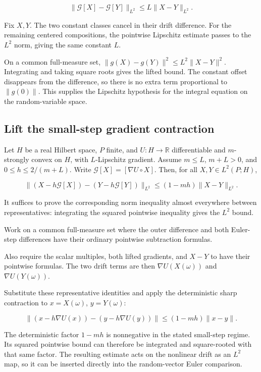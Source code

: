 \documentclass[11pt,a4paper]{article}
\begin{document}
\[\|\mathcal G[X]-\mathcal G[Y]\|_{L^2}\le L\|X-Y\|_{L^2}.\]

Fix \(X,Y\). The two constant classes cancel in their drift difference. For the remaining centered compositions, the pointwise Lipschitz estimate passes to the \(L^2\) norm, giving the same constant \(L\).



On a common full-measure set, \(\|g(X)-g(Y)\|^2\le L^2\|X-Y\|^2\). Integrating and taking square roots gives the lifted bound. The constant offset disappears from the difference, so there is no extra term proportional to \(\|g(0)\|\). This supplies the Lipschitz hypothesis for the integral equation on the random-variable space.


\subsection{\texorpdfstring{Lift the small-step gradient contraction}{Lift the small-step gradient contraction}}


Let \(H\) be a real Hilbert space, \(P\) finite, and \(U:H\to\mathbb R\) differentiable and \(m\)-strongly convex on \(H\), with \(L\)-Lipschitz gradient. Assume \(m\le L\), \(m+L>0\), and \(0\le h\le2/(m+L)\). Write \(\mathcal G[X]=[\nabla U\circ X]\). Then, for all \(X,Y\in L^2(P;H)\),

\[\|(X-h\mathcal G[X])-(Y-h\mathcal G[Y])\|_{L^2}\le(1-mh)\|X-Y\|_{L^2}.\]

It suffices to prove the corresponding norm inequality almost everywhere between representatives: integrating the squared pointwise inequality gives the \(L^2\) bound.



Work on a common full-measure set where the outer difference and both Euler-step differences have their ordinary pointwise subtraction formulas.



Also require the scalar multiples, both lifted gradients, and \(X-Y\) to have their pointwise formulas. The two drift terms are then \(\nabla U(X(\omega))\) and \(\nabla U(Y(\omega))\).



Substitute these representative identities and apply the deterministic sharp contraction to \(x=X(\omega)\), \(y=Y(\omega)\):

\[\|(x-h\nabla U(x))-(y-h\nabla U(y))\|\le(1-mh)\|x-y\|.\]

The deterministic factor \(1-mh\) is nonnegative in the stated small-step regime. Its squared pointwise bound can therefore be integrated and square-rooted with that same factor. The resulting estimate acts on the nonlinear drift as an \(L^2\) map, so it can be inserted directly into the random-vector Euler comparison.
\end{document}
